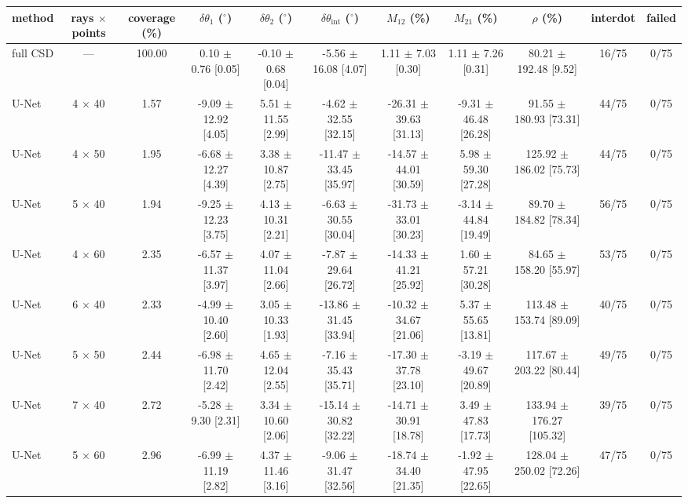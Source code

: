 \begin{tabular}{lcccccccccc}
\hline
method & rays $\times$ points & coverage (\%) & $\delta\theta_1$ ($^\circ$) & $\delta\theta_2$ ($^\circ$) & $\delta\theta_\mathrm{int}$ ($^\circ$) & $M_{12}$ (\%) & $M_{21}$ (\%) & $\rho$ (\%) & interdot & failed \\ \hline
full CSD & — & 100.00 & 0.10 $\pm$ 0.76 [0.05] & -0.10 $\pm$ 0.68 [0.04] & -5.56 $\pm$ 16.08 [4.07] & 1.11 $\pm$ 7.03 [0.30] & 1.11 $\pm$ 7.26 [0.31] & 80.21 $\pm$ 192.48 [9.52] & 16/75 & 0/75 \\
U-Net & 4 $\times$ 40 & 1.57 & -9.09 $\pm$ 12.92 [4.05] & 5.51 $\pm$ 11.55 [2.99] & -4.62 $\pm$ 32.55 [32.15] & -26.31 $\pm$ 39.63 [31.13] & -9.31 $\pm$ 46.48 [26.28] & 91.55 $\pm$ 180.93 [73.31] & 44/75 & 0/75 \\
U-Net & 4 $\times$ 50 & 1.95 & -6.68 $\pm$ 12.27 [4.39] & 3.38 $\pm$ 10.87 [2.75] & -11.47 $\pm$ 33.45 [35.97] & -14.57 $\pm$ 44.01 [30.59] & 5.98 $\pm$ 59.30 [27.28] & 125.92 $\pm$ 186.02 [75.73] & 44/75 & 0/75 \\
U-Net & 5 $\times$ 40 & 1.94 & -9.25 $\pm$ 12.23 [3.75] & 4.13 $\pm$ 10.31 [2.21] & -6.63 $\pm$ 30.55 [30.04] & -31.73 $\pm$ 33.01 [30.23] & -3.14 $\pm$ 44.84 [19.49] & 89.70 $\pm$ 184.82 [78.34] & 56/75 & 0/75 \\
U-Net & 4 $\times$ 60 & 2.35 & -6.57 $\pm$ 11.37 [3.97] & 4.07 $\pm$ 11.04 [2.66] & -7.87 $\pm$ 29.64 [26.72] & -14.33 $\pm$ 41.21 [25.92] & 1.60 $\pm$ 57.21 [30.28] & 84.65 $\pm$ 158.20 [55.97] & 53/75 & 0/75 \\
U-Net & 6 $\times$ 40 & 2.33 & -4.99 $\pm$ 10.40 [2.60] & 3.05 $\pm$ 10.33 [1.93] & -13.86 $\pm$ 31.45 [33.94] & -10.32 $\pm$ 34.67 [21.06] & 5.37 $\pm$ 55.65 [13.81] & 113.48 $\pm$ 153.74 [89.09] & 40/75 & 0/75 \\
U-Net & 5 $\times$ 50 & 2.44 & -6.98 $\pm$ 11.70 [2.42] & 4.65 $\pm$ 12.04 [2.55] & -7.16 $\pm$ 35.43 [35.71] & -17.30 $\pm$ 37.78 [23.10] & -3.19 $\pm$ 49.67 [20.89] & 117.67 $\pm$ 203.22 [80.44] & 49/75 & 0/75 \\
U-Net & 7 $\times$ 40 & 2.72 & -5.28 $\pm$ 9.30 [2.31] & 3.34 $\pm$ 10.60 [2.06] & -15.14 $\pm$ 30.82 [32.22] & -14.71 $\pm$ 30.91 [18.78] & 3.49 $\pm$ 47.83 [17.73] & 133.94 $\pm$ 176.27 [105.32] & 39/75 & 0/75 \\
U-Net & 5 $\times$ 60 & 2.96 & -6.99 $\pm$ 11.19 [2.82] & 4.37 $\pm$ 11.46 [3.16] & -9.06 $\pm$ 31.47 [32.56] & -18.74 $\pm$ 34.40 [21.35] & -1.92 $\pm$ 47.95 [22.65] & 128.04 $\pm$ 250.02 [72.26] & 47/75 & 0/75 \\

\end{tabular}

